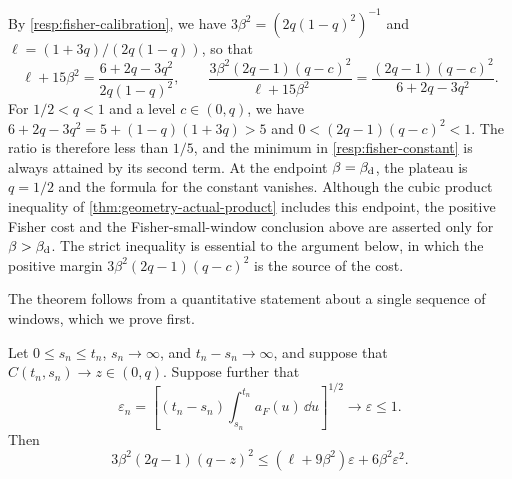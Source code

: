 \begin{remark}\label{rem:fisher-constant}
By \eqref{resp:fisher-calibration}, we have $3\beta^2=(2q(1-q)^2)^{-1}$ and $\ell=(1+3q)/(2q(1-q))$, so that
\[
 \ell+15\beta^2=\frac{6+2q-3q^2}{2q(1-q)^2},
 \qquad
 \frac{3\beta^2(2q-1)(q-c)^2}{\ell+15\beta^2}=\frac{(2q-1)(q-c)^2}{6+2q-3q^2} .
\]
For $1/2<q<1$ and a level $c\in(0,q)$, we have $6+2q-3q^2=5+(1-q)(1+3q)>5$ and $0<(2q-1)(q-c)^2<1$. The ratio is therefore less than $1/5$, and the minimum in \eqref{resp:fisher-constant} is always attained by its second term. At the endpoint $\beta=\beta_{\mathrm d}$, the plateau is $q=1/2$ and the formula for the constant vanishes. Although the cubic product inequality of \cref{thm:geometry-actual-product} includes this endpoint, the positive Fisher cost and the Fisher-small-window conclusion above are asserted only for $\beta>\beta_{\mathrm d}$. The strict inequality is essential to the argument below, in which the positive margin $3\beta^2(2q-1)(q-c)^2$ is the source of the cost.
\end{remark}

The theorem follows from a quantitative statement about a single sequence of windows, which we prove first.

\begin{lemma}
\label{resp:fisher-obstruction}
Let $0\le s_n\le t_n$, $s_n\to\infty$, and $t_n-s_n\to\infty$, and suppose that $C(t_n,s_n)\to z\in(0,q)$. Suppose further that
\[
 \varepsilon_n=\left[(t_n-s_n)\int_{s_n}^{t_n}a_F(u)\,\dd u\right]^{1/2}\longrightarrow\varepsilon\le1 .
\]
Then
\begin{equation}
 3\beta^2(2q-1)(q-z)^2\le(\ell+9\beta^2)\varepsilon+6\beta^2\varepsilon^2 .
 \label{resp:sequential-obstruction}
\end{equation}
\end{lemma}

